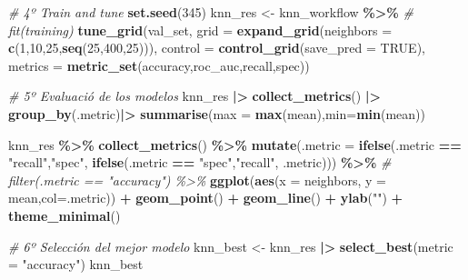 \documentclass[12pt,a4paper,]{book}
\newenvironment{Shaded}{\begin{snugshade}}{\end{snugshade}}
\newcommand{\AttributeTok}[1]{\textcolor[rgb]{0.13,0.29,0.53}{#1}}
\newcommand{\CommentTok}[1]{\textcolor[rgb]{0.56,0.35,0.01}{\textit{#1}}}
\newcommand{\ConstantTok}[1]{\textcolor[rgb]{0.56,0.35,0.01}{#1}}
\newcommand{\DecValTok}[1]{\textcolor[rgb]{0.00,0.00,0.81}{#1}}
\newcommand{\FunctionTok}[1]{\textcolor[rgb]{0.13,0.29,0.53}{\textbf{#1}}}
\newcommand{\NormalTok}[1]{#1}
\newcommand{\OtherTok}[1]{\textcolor[rgb]{0.56,0.35,0.01}{#1}}
\newcommand{\SpecialCharTok}[1]{\textcolor[rgb]{0.81,0.36,0.00}{\textbf{#1}}}
\newcommand{\StringTok}[1]{\textcolor[rgb]{0.31,0.60,0.02}{#1}}
\numberwithin{dummy}{section}
\theoremstyle{ocrenumbox}
\theoremstyle{blacknumex}
\theoremstyle{blacknumbox}
\theoremstyle{ocrenum}
\theoremstyle{ocrenum}
\begin{document}
\begin{Shaded}
\begin{Highlighting}[]
\CommentTok{\# 4º Train and tune}
\FunctionTok{set.seed}\NormalTok{(}\DecValTok{345}\NormalTok{)}
\NormalTok{knn\_res }\OtherTok{\textless{}{-}} 
\NormalTok{  knn\_workflow }\SpecialCharTok{\%\textgreater{}\%} 
  \CommentTok{\# fit(training)}
  \FunctionTok{tune\_grid}\NormalTok{(val\_set,}
            \AttributeTok{grid =} \FunctionTok{expand\_grid}\NormalTok{(}\AttributeTok{neighbors =} \FunctionTok{c}\NormalTok{(}\DecValTok{1}\NormalTok{,}\DecValTok{10}\NormalTok{,}\DecValTok{25}\NormalTok{,}\FunctionTok{seq}\NormalTok{(}\DecValTok{25}\NormalTok{,}\DecValTok{400}\NormalTok{,}\DecValTok{25}\NormalTok{))),}
            \AttributeTok{control =} \FunctionTok{control\_grid}\NormalTok{(}\AttributeTok{save\_pred =} \ConstantTok{TRUE}\NormalTok{),}
            \AttributeTok{metrics =} \FunctionTok{metric\_set}\NormalTok{(accuracy,roc\_auc,recall,spec))}

\CommentTok{\# 5º Evaluació de los modelos}
\NormalTok{knn\_res }\SpecialCharTok{|\textgreater{}} 
  \FunctionTok{collect\_metrics}\NormalTok{() }\SpecialCharTok{|\textgreater{}} 
  \FunctionTok{group\_by}\NormalTok{(.metric)}\SpecialCharTok{|\textgreater{}} 
  \FunctionTok{summarise}\NormalTok{(}\AttributeTok{max =} \FunctionTok{max}\NormalTok{(mean),}\AttributeTok{min=}\FunctionTok{min}\NormalTok{(mean))}

\NormalTok{knn\_res }\SpecialCharTok{\%\textgreater{}\%} 
  \FunctionTok{collect\_metrics}\NormalTok{() }\SpecialCharTok{\%\textgreater{}\%}  
  \FunctionTok{mutate}\NormalTok{(}\AttributeTok{.metric =} \FunctionTok{ifelse}\NormalTok{(.metric }\SpecialCharTok{==} \StringTok{"recall"}\NormalTok{,}\StringTok{"spec"}\NormalTok{,}
                          \FunctionTok{ifelse}\NormalTok{(.metric }\SpecialCharTok{==} \StringTok{"spec"}\NormalTok{,}\StringTok{"recall"}\NormalTok{,}
\NormalTok{                                 .metric))) }\SpecialCharTok{\%\textgreater{}\%} 
  \CommentTok{\# filter(.metric == "accuracy") \%\textgreater{}\%}
  \FunctionTok{ggplot}\NormalTok{(}\FunctionTok{aes}\NormalTok{(}\AttributeTok{x =}\NormalTok{ neighbors, }\AttributeTok{y =}\NormalTok{ mean,}\AttributeTok{col=}\NormalTok{.metric)) }\SpecialCharTok{+} 
  \FunctionTok{geom\_point}\NormalTok{() }\SpecialCharTok{+} 
  \FunctionTok{geom\_line}\NormalTok{() }\SpecialCharTok{+} 
  \FunctionTok{ylab}\NormalTok{(}\StringTok{""}\NormalTok{) }\SpecialCharTok{+}
  \FunctionTok{theme\_minimal}\NormalTok{()}

\CommentTok{\# 6º Selección del mejor modelo}
\NormalTok{knn\_best }\OtherTok{\textless{}{-}}\NormalTok{ knn\_res }\SpecialCharTok{|\textgreater{}} 
  \FunctionTok{select\_best}\NormalTok{(}\AttributeTok{metric =} \StringTok{"accuracy"}\NormalTok{)}
\NormalTok{knn\_best}
\end{Highlighting}
\end{Shaded}
\end{document}

